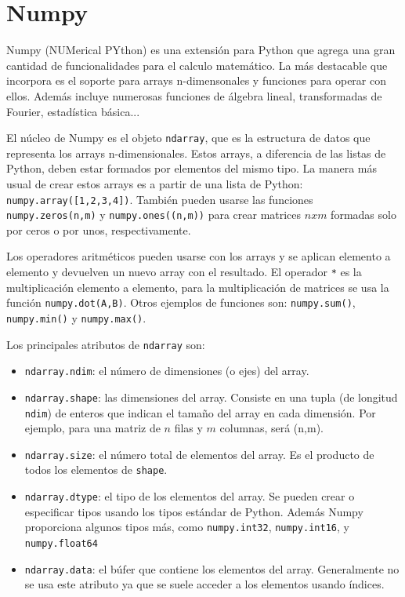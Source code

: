 \documentclass[a4paper,openright, 12pt]{book}
\begin{document}
\section{Numpy} \label{sec.numpy}
Numpy (NUMerical PYthon) es una extensión para Python que agrega una gran cantidad de funcionalidades para el calculo matemático. La más destacable que incorpora es el soporte para arrays n-dimensonales y funciones para operar con ellos. Además incluye numerosas funciones de álgebra lineal, transformadas de Fourier, estadística básica...

El núcleo de Numpy es el objeto \lstinline|ndarray|, que es la estructura de datos que representa los arrays n-dimensionales. Estos arrays, a diferencia de las listas de Python, deben estar formados por elementos del mismo tipo.
La manera más usual de crear estos arrays es a partir de una lista de Python: \lstinline|numpy.array([1,2,3,4])|. También pueden usarse las funciones \lstinline|numpy.zeros(n,m)| y \lstinline|numpy.ones((n,m))| para crear matrices $nxm$ formadas solo por ceros o por unos, respectivamente.

Los operadores aritméticos pueden usarse con los arrays y se aplican elemento a elemento y devuelven un nuevo array con el resultado.
El operador \lstinline|*| es la multiplicación elemento a elemento, para la multiplicación de matrices se usa la función \lstinline|numpy.dot(A,B)|.
Otros ejemplos de funciones son: \lstinline|numpy.sum()|, \lstinline|numpy.min()| y \lstinline|numpy.max()|.

Los principales atributos de \lstinline|ndarray| son:
 \begin{itemize}
\item \lstinline|ndarray.ndim|: el número de dimensiones (o ejes) del array.
 
\item \lstinline|ndarray.shape|: las dimensiones del array. Consiste en una tupla (de longitud \lstinline|ndim|) de enteros que indican el tamaño del array en cada dimensión. Por ejemplo, para una matriz de $n$ filas y $m$ columnas, será (n,m).

\item  \lstinline|ndarray.size|: el número total de elementos del array. Es el producto de todos los elementos de \lstinline|shape|. 

\item\lstinline|ndarray.dtype|: el tipo de los elementos del array. Se pueden crear o especificar tipos usando los tipos estándar de Python. Además Numpy proporciona algunos tipos más, como \lstinline|numpy.int32|, \lstinline|numpy.int16|, y \lstinline|numpy.float64|

\item \lstinline|ndarray.data|: el búfer que contiene los elementos del array. Generalmente no se usa este atributo ya que se suele acceder a los elementos usando índices.
 \end{itemize}
\end{document}
